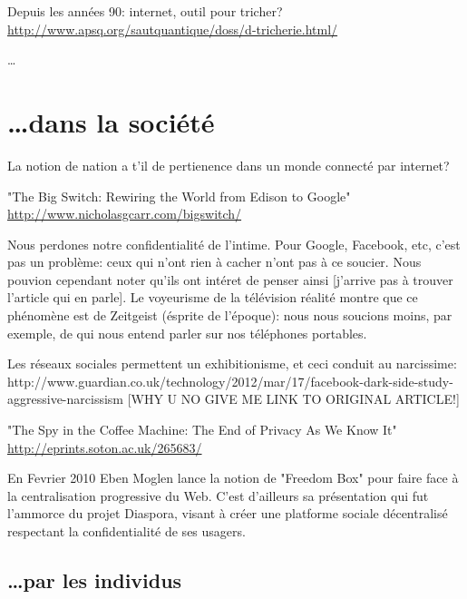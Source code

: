 Depuis les années 90: internet, outil pour tricher?
\url{http://www.apsq.org/sautquantique/doss/d-tricherie.html/}

\ldots

\section{\ldots dans la société}

La notion de nation a t'il de pertienence dans un monde connecté par internet?

"The Big Switch: Rewiring the World from Edison to Google" 
 \url{http://www.nicholasgcarr.com/bigswitch/}

Nous perdones notre confidentialité de l'intime. Pour Google, Facebook, etc, 
c'est pas un problème: ceux qui n'ont rien à cacher n'ont pas à ce soucier. Nous
pouvion cependant noter qu'ils ont intéret de penser ainsi [j'arrive pas à 
trouver l'article qui en parle]. Le voyeurisme de la télévision réalité montre 
que ce phénomène est de Zeitgeist (ésprite de l'époque): nous nous soucions 
moins, par exemple, de qui nous entend parler sur nos téléphones portables.

Les réseaux sociales permettent un exhibitionisme, et ceci conduit au 
narcissime:
http://www.guardian.co.uk/technology/2012/mar/17/facebook-dark-side-study-aggressive-narcissism 
[WHY U NO GIVE ME LINK TO ORIGINAL ARTICLE!]

"The Spy in the Coffee Machine: The End of Privacy As We Know It"
 \url{http://eprints.soton.ac.uk/265683/}

En Fevrier 2010 Eben Moglen lance la notion de "Freedom Box" pour faire face à
la centralisation progressive du Web. C'est d'ailleurs sa présentation qui fut
l'ammorce du projet Diaspora, visant à créer une platforme sociale décentralisé 
respectant la confidentialité de ses usagers. 

\subsection{\ldots par les individus}


